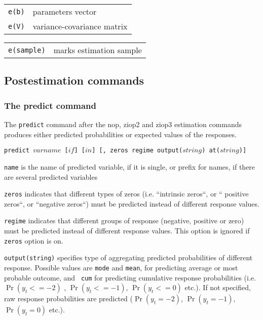 \documentclass[letterpaper,fleqn,12pt]{article}
\begin{document}
\begin{onehalfspace}

\begin{tabular}{p{3cm}p{12cm}}
\texttt{e(b)} & parameters vector \\ 
\texttt{e(V)} & variance-covariance matrix%
\end{tabular}


\begin{tabular}{p{3cm}p{12cm}}
\texttt{e(sample)} & marks estimation sample%
\end{tabular}

\subsection{Postestimation commands}

\subsubsection*{The predict command}

The \texttt{predict} command after the nop, ziop2 and ziop3 estimation
commands produces either predicted probabilities or expected values of the
responses.

\texttt{predict $varname$ [$if$] [$in$] [, zeros regime output($string$) at($%
string$)]}

\texttt{name} is the name of predicted variable, if it is single, or prefix
for names, if there are several predicted variables

\texttt{zeros} indicates that different types of zeros (i.e.
\textquotedblleft intrinsic zeros\textquotedblleft , or \textquotedblleft
positive zeros\textquotedblleft , or \textquotedblleft negative
zeros\textquotedblleft ) must be predicted instead of different response
values.

\texttt{regime} indicates that different groups of response (negative,
positive or zero) must be predicted instead of different response values.
This option is ignored if \texttt{zeros} option is on.

\texttt{output(string)} specifies type of aggregating predicted
probabilities of different response. Possible values are \texttt{mode} and 
\texttt{mean}, for predicting average or most probable outcome, and \texttt{%
cum} for predicting cumulative response probabilities (i.e. $\Pr (y_{t}<=-2)$%
, $\Pr (y_{t}<=-1)$, $\Pr (y_{t}<=0)$ etc.). If not specified, raw response
probabilities are predicted ($\Pr (y_{t}=-2)$, $\Pr (y_{t}=-1)$, $\Pr
(y_{t}=0)$ etc.).


\end{onehalfspace}
\end{document}
